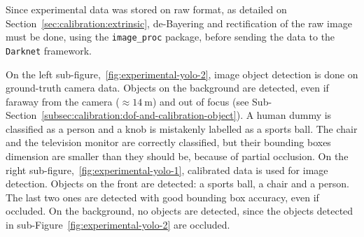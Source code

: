 Since experimental data was stored on raw format, as detailed on Section~\ref{sec:calibration:extrinsic}, de-Bayering and rectification of the raw image must be done, using the \texttt{image\_proc} package, before sending the data to the \texttt{Darknet} framework.

On the left sub-figure,~\ref{fig:experimental-yolo-2}, image object detection is done on ground-truth camera data. Objects on the background are detected, even if faraway from the camera ($\approx\SI{14}{\meter}$) and out of focus (see Sub-Section~\ref{subsec:calibration:dof-and-calibration-object}). A human dummy is classified as a person and a knob is mistakenly labelled as a sports ball. The chair and the television monitor are correctly classified, but their bounding boxes dimension are smaller than they should be, because of partial occlusion.
On the right sub-figure,~\ref{fig:experimental-yolo-1}, calibrated data is used for image detection. Objects on the front are detected: a sports ball, a chair and a person. The last two ones are detected with good bounding box accuracy, even if occluded. On the background, no objects are detected, since the objects detected in sub-Figure~\ref{fig:experimental-yolo-2} are occluded. 

